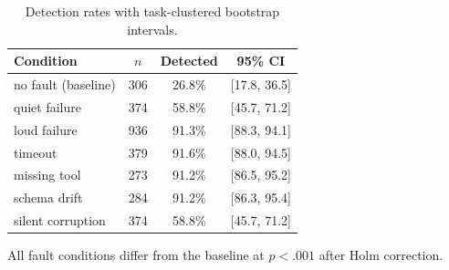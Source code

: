 \begin{table}[!t]
\centering
\caption{Detection rates with task-clustered bootstrap intervals.}
\label{tab:rq1}
\footnotesize
\setlength{\tabcolsep}{4pt}
\begin{tabular}{lccc}
\hline
Condition & $n$ & Detected & 95\% CI \\
\hline
no fault (baseline) & 306 & 26.8\% & [17.8, 36.5] \\
quiet failure & 374 & 58.8\% & [45.7, 71.2] \\
loud failure & 936 & 91.3\% & [88.3, 94.1] \\
\hline
timeout & 379 & 91.6\% & [88.0, 94.5] \\
missing tool & 273 & 91.2\% & [86.5, 95.2] \\
schema drift & 284 & 91.2\% & [86.3, 95.4] \\
silent corruption & 374 & 58.8\% & [45.7, 71.2] \\
\hline
\end{tabular}
\par\smallskip\scriptsize All fault conditions differ from the baseline at $p < .001$ after Holm correction.
\end{table}

